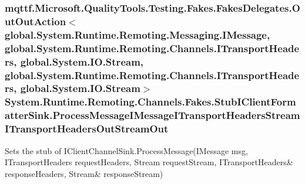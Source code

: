\hypertarget{class_system_1_1_runtime_1_1_remoting_1_1_channels_1_1_fakes_1_1_stub_i_client_formatter_sink_a33afdb93f6abb714836333d1db941b7e}{
\subsubsection[{Process\-Message\-I\-Message\-I\-Transport\-Headers\-Stream\-I\-Transport\-Headers\-Out\-Stream\-Out}]{\setlength{\rightskip}{0pt plus 5cm}mqttf.\-Microsoft.\-Quality\-Tools.\-Testing.\-Fakes.\-Fakes\-Delegates.\-Out\-Out\-Action$<$global.\-System.\-Runtime.\-Remoting.\-Messaging.\-I\-Message, global.\-System.\-Runtime.\-Remoting.\-Channels.\-I\-Transport\-Headers, global.\-System.\-I\-O.\-Stream, global.\-System.\-Runtime.\-Remoting.\-Channels.\-I\-Transport\-Headers, global.\-System.\-I\-O.\-Stream$>$ System.\-Runtime.\-Remoting.\-Channels.\-Fakes.\-Stub\-I\-Client\-Formatter\-Sink.\-Process\-Message\-I\-Message\-I\-Transport\-Headers\-Stream\-I\-Transport\-Headers\-Out\-Stream\-Out}}\label{class_system_1_1_runtime_1_1_remoting_1_1_channels_1_1_fakes_1_1_stub_i_client_formatter_sink_a33afdb93f6abb714836333d1db941b7e}


Sets the stub of I\-Client\-Channel\-Sink.\-Process\-Message(I\-Message msg, I\-Transport\-Headers request\-Headers, Stream request\-Stream, I\-Transport\-Headers\& response\-Headers, Stream\& response\-Stream)

